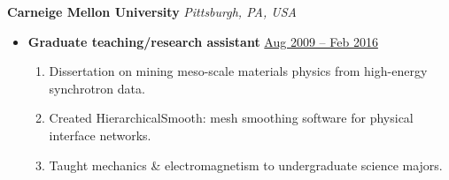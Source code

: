 {\color{red}\textbf{Carneige Mellon University} \hfill \textit{Pittsburgh, PA, USA}}\par
\begin{itemize}
    \item
        \textbf{Graduate teaching/research assistant}
        \hfill \underline{Aug 2009 -- Feb 2016} \par
        \begin{enumerate}
            \item Dissertation on mining meso-scale materials physics from high-energy synchrotron data.
            \item Created HierarchicalSmooth: mesh smoothing software for physical interface networks. 
            \item Taught mechanics \& electromagnetism to undergraduate science majors.
        \end{enumerate}
\end{itemize}